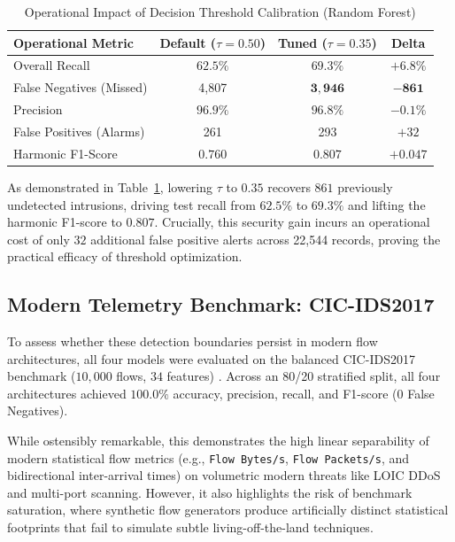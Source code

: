 \documentclass[conference]{IEEEtran}
\begin{document}
\begin{table}[h]
\caption{Operational Impact of Decision Threshold Calibration (Random Forest)}
\label{tab:threshold}
\centering
\begin{tabular}{lccc}
\toprule
\textbf{Operational Metric} & \textbf{Default ($\tau=0.50$)} & \textbf{Tuned ($\tau=0.35$)} & \textbf{Delta} \\
\midrule
Overall Recall & $62.5\%$ & $\mathbf{69.3\%}$ & $\mathbf{+6.8\%}$ \\
False Negatives (Missed) & 4,807 & $\mathbf{3,946}$ & $\mathbf{-861}$ \\
Precision & $96.9\%$ & $96.8\%$ & $-0.1\%$ \\
False Positives (Alarms) & 261 & 293 & $+32$ \\
Harmonic F1-Score & $0.760$ & $\mathbf{0.807}$ & $\mathbf{+0.047}$ \\
\bottomrule
\end{tabular}
\end{table}

As demonstrated in Table~\ref{tab:threshold}, lowering $\tau$ to $0.35$ recovers $861$ previously undetected intrusions, driving test recall from $62.5\%$ to $69.3\%$ and lifting the harmonic F1-score to $0.807$. Crucially, this security gain incurs an operational cost of only $32$ additional false positive alerts across 22,544 records, proving the practical efficacy of threshold optimization.

\subsection{Modern Telemetry Benchmark: CIC-IDS2017}

To assess whether these detection boundaries persist in modern flow architectures, all four models were evaluated on the balanced CIC-IDS2017 benchmark ($10,000$ flows, $34$ features) \cite{sharafaldin2018toward}. Across an 80/20 stratified split, all four architectures achieved $100.0\%$ accuracy, precision, recall, and F1-score ($0$ False Negatives).

While ostensibly remarkable, this demonstrates the high linear separability of modern statistical flow metrics (e.g., \texttt{Flow Bytes/s}, \texttt{Flow Packets/s}, and bidirectional inter-arrival times) on volumetric modern threats like LOIC DDoS and multi-port scanning. However, it also highlights the risk of benchmark saturation, where synthetic flow generators produce artificially distinct statistical footprints that fail to simulate subtle living-off-the-land techniques.
\end{document}
